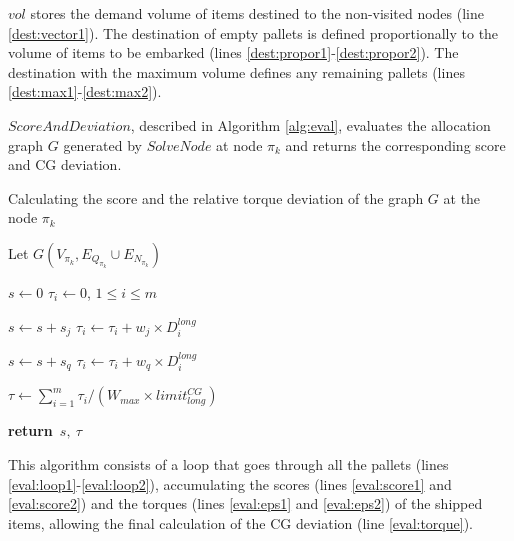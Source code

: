 \documentclass[preprint]{elsarticle}
\renewcommand{\Return}{\State \textbf{return}~}
\begin{document}
$vol$\/ stores the demand volume of items destined to the non-visited nodes (line \ref{dest:vector1}). The destination of empty pallets is defined proportionally to the volume of items to be embarked (lines \ref{dest:propor1}-\ref{dest:propor2}). The destination with the maximum volume defines any remaining pallets (lines \ref{dest:max1}-\ref{dest:max2}).


$ScoreAndDeviation$, described in Algorithm \ref{alg:eval}, evaluates the allocation graph $G$\/ generated by $SolveNode$\/ at node $\pi_k$\/ and returns the corresponding score and CG deviation.


\begin{algorithm}[H]
	\caption{Calculating the score and the relative torque deviation of the graph $G$\/ at the node $\pi_k$}  \label{alg:eval}
	\begin{algorithmic}[1]
		
		
		\State Let $G(V_{\pi_k}, E_{Q_{\pi_k}} \cup E_{N_{\pi_k}})$
		
		\State $s \gets 0$
		\State $\tau_i \gets 0$, $1 \leq i \leq m$
			\label{eval:loop1}
						
			
					\State $s \gets s + s_j$ \label{eval:score1}
					\State $\tau_i \gets \tau_i + w_j \times D_i^{long}$ \label{eval:eps1}
				\EndIf
			\EndFor	
					
					\State $s \gets s + s_q$   \label{eval:score2}
					\State $\tau_i \gets \tau_i + w_q \times D_i^{long}$  \label{eval:eps2}
				\EndIf
			\EndFor	   \label{eval:loop2}
		\EndFor
		
		\State $\tau \gets  \sum_{i=1}^{m} \tau_i / (W_{max} \times limit^{CG}_{long})$ \label{eval:torque}
		
		\Return $s,\ \tau$
		\EndProcedure
		
	\end{algorithmic}
\end{algorithm}


This algorithm consists of a loop that goes through all the pallets (lines \ref{eval:loop1}-\ref{eval:loop2}), accumulating the scores (lines \ref{eval:score1} and \ref{eval:score2}) and the torques (lines \ref{eval:eps1} and \ref{eval:eps2}) of the shipped items, allowing the final calculation of the CG deviation (line \ref{eval:torque}).
\end{document}
